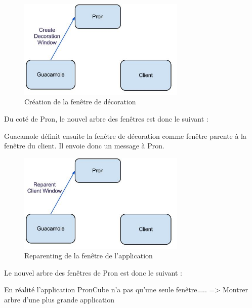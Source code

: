 \begin{figure}[H]
  \centering
  \includegraphics[width=8cm]{images/Guacamole_anim_4.jpg}
  \caption{Création de la fenêtre de décoration}
  \label{fig:guacamole_anim_4}
\end{figure}

Du coté de Pron, le nouvel arbre des fenêtres est donc le suivant :

\begin{center}
\end{center}

Guacamole définit ensuite la fenêtre de décoration comme fenêtre parente à la fenêtre du client.
Il envoie donc un message à Pron.

\begin{figure}[H]
  \centering
  \includegraphics[width=8cm]{images/Guacamole_anim_5.jpg}
  \caption{Reparenting de la fenêtre de l'application}
  \label{fig:guacamole_anim_5}
\end{figure}

Le nouvel arbre des fenêtres de Pron est donc le suivant :

\begin{center}
\end{center}


En réalité l'application PronCube n'a pas qu'une seule fenêtre..... => Montrer arbre d'une plus grande application